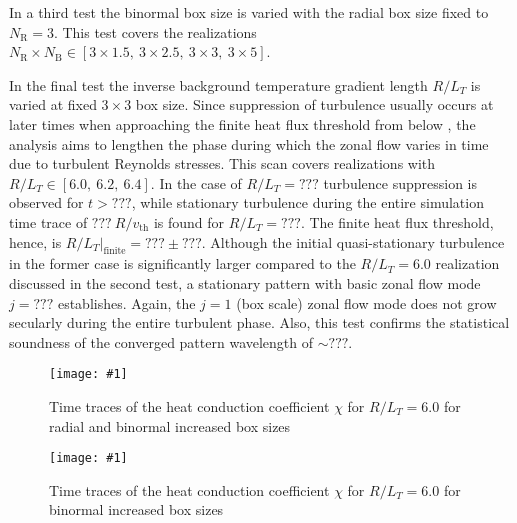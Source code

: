 \documentclass[aip, amsmath, amssymb, reprint, twocolumn]{revtex4-1}
\newcommand{\includegraphicsOneCol}[3]{
	\begin{figure}[ht]
		\texttt{[image: \#1]}
		\caption{#2}
		\label{#3}
  	\end{figure}
  	\increasecounter{fig}{1}
}
\newcommand{\NR}{N_\mathrm{R}}
\newcommand{\NB}{N_\mathrm{B}}
\newcommand{\rlt}{R/L_T}
\newcommand{\vth}{v_{\mathrm{th}}}
\begin{document}
In a third test the binormal box size is varied with the radial box size fixed to $\NR = 3$.
This test covers the realizations $\NR \times \NB \in [3\times1.5,~3\times2.5,~3\times3,~3\times5]$.
\bigskip

In the final test the inverse background temperature gradient length $\rlt$ is varied at fixed $3\times3$ box size.
Since suppression of turbulence usually occurs at later times when approaching the finite heat flux threshold from below \cite{peeters2016}, the analysis aims to lengthen the phase during which the zonal flow varies in time due to turbulent Reynolds stresses.
This scan covers realizations with $\rlt \in [6.0,~6.2,~6.4]$.
In the case of $\rlt = ???$ turbulence suppression is observed for $t > ???$, while stationary turbulence during the entire simulation time trace of $???~R/\vth$ is found for $\rlt = ???$.
The finite heat flux threshold, hence, is $\rlt|_\mathrm{finite} = ??? \pm ???$.
Although the initial quasi-stationary turbulence in the former case is significantly larger compared to the $\rlt = 6.0$ realization discussed in the second test, a stationary pattern with basic zonal flow mode $j = ???$ establishes. 
Again, the $j = 1$ (box scale) zonal flow mode does not grow secularly during the entire turbulent phase.
Also, this test confirms the statistical soundness of the converged pattern wavelength of $\sim ???$.

\includegraphicsOneCol{{Comparison/Boxsize/S6_rlt6.0_boxsize1x1-2x2-3x3_Ns16_Nvpar48_Nmu9_eflux_comparison}.pdf}{
	Time traces of the heat conduction coefficient $\chi$ for $R/L_T = 6.0$ for radial and binormal increased box sizes
}{fig:eflux-1x1-2x2-3x3-comparison}

\includegraphicsOneCol{{Comparison/Boxsize/S6_rlt6.0_boxsize3x1-1.5-2.5-3-5_Ns16_Nvpar48_Nmu9_eflux_comparison}.pdf}{
	Time traces of the heat conduction coefficient $\chi$ for $R/L_T = 6.0$ for binormal increased box sizes
}{fig:eflux-1x1-2x2-3x3-comparison}


\end{document}
